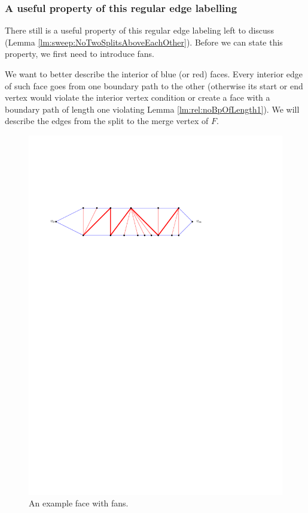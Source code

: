 \subsubsection{A useful property of this regular edge labelling}
  There still is a useful property of this regular edge labeling left to discuss (Lemma \ref{lm:sweep:NoTwoSplitsAboveEachOther}). Before we can state this property, we first need to introduce fans.

    We want to better describe the interior of blue (or red) faces. Every interior edge of such face goes from one boundary path to the other (otherwise its start or end vertex would violate the interior vertex condition or create a face with a boundary path of length one violating Lemma \ref{lm:rel:noBpOfLength1}). We will describe the edges from the split to the merge vertex of $F$.

    \begin{figure}[t]
      \centering
      \includegraphics[scale=.9]{rectangularDuals/img/fans}
      \caption{An example face with fans.}
      \label{fig:uni:fans}
    \end{figure}

